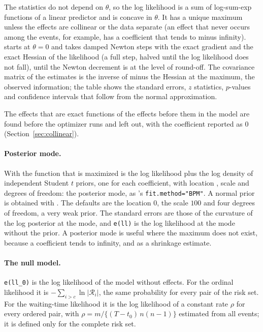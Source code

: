 The statistics do not depend on $\theta$, so the log likelihood is a sum of log-sum-exp functions of a linear predictor and is concave in $\theta$. It has a unique maximum unless the effects are collinear or the data separate (an effect that never occurs among the events, for example, has a coefficient that tends to minus infinity). \nwrem{} starts at $\theta=0$ and takes damped Newton steps with the exact gradient and the exact Hessian of the likelihood (a full step, halved until the log likelihood does not fall), until the Newton decrement is at the level of round-off. The covariance matrix of the estimates is the inverse of minus the Hessian at the maximum, the observed information; the table shows the standard errors, $z$ statistics, $p$-values and confidence intervals that follow from the normal approximation.

The effects that are exact functions of the effects before them in the model are found before the optimizer runs and left out, with the coefficient reported as $0$ (Section~\ref{sec:collinear}).

\paragraph{Posterior mode.} With  the function that is maximized is the log likelihood plus the log density of independent Student $t$ priors, one for each coefficient, with location , scale  and  degrees of freedom: the posterior mode, as \relevent{}'s \texttt{fit.method="BPM"}. A normal prior is obtained with . The defaults are the location $0$, the scale $100$ and four degrees of freedom, a very weak prior. The standard errors are those of the curvature of the log posterior at the mode, and \texttt{e(ll)} is the log likelihood at the mode without the prior. A posterior mode is useful where the maximum does not exist, because a coefficient tends to infinity, and as a shrinkage estimate.

\paragraph{The null model.} \texttt{e(ll\_0)} is the log likelihood of the model without effects. For the ordinal likelihood it is $-\sum_{i>c}\ln|\mathcal R_i|$, the same probability for every pair of the risk set. For the waiting-time likelihood it is the log likelihood of a constant rate $\rho$ for every ordered pair, with $\rho=m/\{(T-t_0)\,n(n-1)\}$ estimated from all events; it is defined only for the complete risk set.
